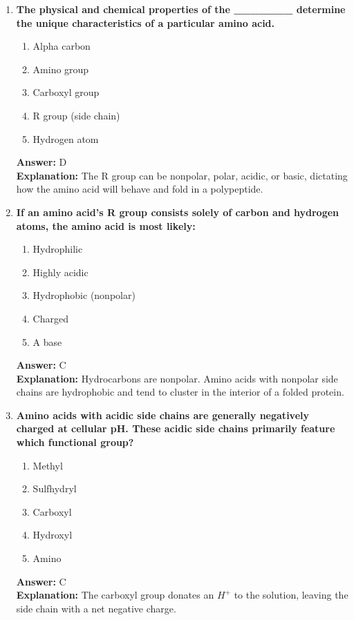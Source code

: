 \documentclass[11pt, a4paper]{article}
\begin{document}
\begin{enumerate}
\item \textbf{The physical and chemical properties of the \_\_\_\_\_\_\_ determine the unique characteristics of a particular amino acid.}
\begin{enumerate}[label=\Alph*.]
    \item Alpha carbon
    \item Amino group
    \item Carboxyl group
    \item R group (side chain)
    \item Hydrogen atom
\end{enumerate}
\textbf{Answer:} D \\
\textbf{Explanation:} The R group can be nonpolar, polar, acidic, or basic, dictating how the amino acid will behave and fold in a polypeptide.

\item \textbf{If an amino acid's R group consists solely of carbon and hydrogen atoms, the amino acid is most likely:}
\begin{enumerate}[label=\Alph*.]
    \item Hydrophilic
    \item Highly acidic
    \item Hydrophobic (nonpolar)
    \item Charged
    \item A base
\end{enumerate}
\textbf{Answer:} C \\
\textbf{Explanation:} Hydrocarbons are nonpolar. Amino acids with nonpolar side chains are hydrophobic and tend to cluster in the interior of a folded protein.

\item \textbf{Amino acids with acidic side chains are generally negatively charged at cellular pH. These acidic side chains primarily feature which functional group?}
\begin{enumerate}[label=\Alph*.]
    \item Methyl
    \item Sulfhydryl
    \item Carboxyl
    \item Hydroxyl
    \item Amino
\end{enumerate}
\textbf{Answer:} C \\
\textbf{Explanation:} The carboxyl group donates an $H^+$ to the solution, leaving the side chain with a net negative charge.


\end{enumerate}
\end{document}
